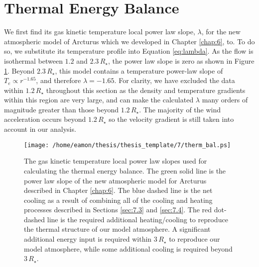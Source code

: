 \section{Thermal Energy Balance}\label{sec:7.5}
We first find its gas kinetic temperature local power law slope, $\lambda$, for the new atmospheric model of Arcturus which we developed in Chapter \ref{chap:6}, to. To do so, we substitute its temperature profile into Equation \ref{eq:lambda}. As the flow is isothermal between $1.2$ and $2.3\,R_{\star}$, the power law slope is zero as shown in Figure \ref{fig:7.6}. Beyond $2.3\,R_{\star}$, this model contains a temperature power-law slope of $T_e \propto r^{-1.65}$, and therefore $\lambda = -1.65$. For clarity, we have excluded the data within $1.2\,R_{\star}$ throughout this section as the density and temperature gradients within this region are very large, and can make the calculated $\lambda$ many orders of magnitude greater than those beyond $1.2\,R_{\star}$. The majority of the wind acceleration occurs beyond $1.2\,R_{\star}$ so the velocity gradient is still taken into account in our analysis.

\begin{figure}[!ht]
\centering 
         \texttt{[image: /home/eamon/thesis/thesis\_template/7/therm\_bal.ps]}
\caption[Net thermal balance]{The gas kinetic temperature local power law slopes used for calculating the thermal energy balance. The green solid line is the power law slope of the new atmospheric model for Arcturus described in Chapter \ref{chap:6}. The blue dashed line is the net cooling as a result of combining all of the cooling and heating processes described in Sections \ref{sec:7.3} and \ref{sec:7.4}. The red dot-dashed line is the required additional heating/cooling to reproduce the thermal structure of our model atmosphere. A significant additional energy input is required within $3\,R_{\star}$ to reproduce our model atmosphere, while some additional cooling is required beyond $3\,R_{\star}$. }
\label{fig:7.6}
\end{figure}

